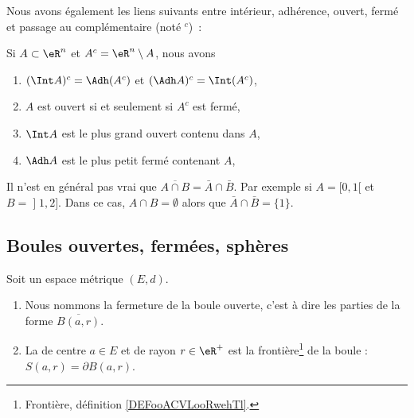 Nous avons également les liens suivants entre intérieur, adhérence, ouvert, fermé et passage au complémentaire (noté \( {}^c\))~:
\begin{proposition}
	Si \( A \subset \eR^n\) et \( A^c = \eR^n\setminus A\), nous
	avons
	\begin{enumerate}
		\item \( (\Int A)^c = \Adh (A^c)\) et \( (\Adh A)^c = \Int
		      (A^c)\),
		\item \( A\) est ouvert si et seulement si \( A^c\) est fermé,
		\item \( \Int A\) est le plus grand ouvert contenu dans \( A\),
		\item \( \Adh A\) est le plus petit fermé contenant \( A\),
	\end{enumerate}
\end{proposition}

\begin{example} \label{ExBFLooUNyvbw}
	Il n'est en général pas vrai que \( \overline{ A\cap B }=\bar A\cap \bar B\). Par exemple si \( A=\mathopen[ 0 , 1 [\) et \( B=\mathopen] 1 , 2 \mathclose]\). Dans ce cas, \( A\cap B=\emptyset\) alors que \( \bar A\cap\bar B=\{ 1 \}\).
\end{example}

\subsection{Boules ouvertes, fermées, sphères}

\begin{definition}      \label{DEFooPDSJooFcUqKH}
	Soit un espace métrique \( (E,d)\).
	\begin{enumerate}
		\item
		      Nous nommons  la fermeture de la boule ouverte, c'est à dire les parties de la forme \( \overline{ B(a,r) }\).
		\item
		      La  de centre \( a\in E\) et de rayon \( r\in \eR^+\) est la frontière\footnote{Frontière, définition \ref{DEFooACVLooRwehTl}.} de la boule : \( S(a,r)=\partial B(a,r)\).
	\end{enumerate}
\end{definition}

